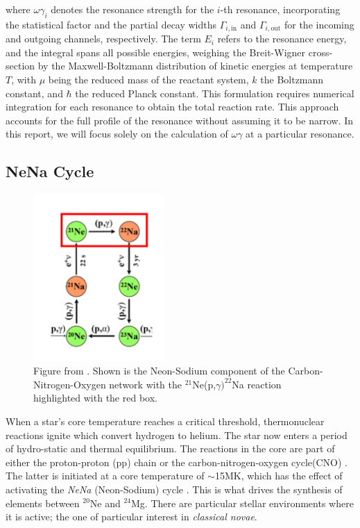\documentclass[a4paper,12pt]{article}
\def\reac{$^{21}$Ne(p,$\gamma)^{22}$Na reaction }
\begin{document}
where \(\omega \gamma_i\) denotes the resonance strength for the \(i\)-th resonance, incorporating the statistical factor and the partial decay widths \(\Gamma_{i,\text{in}}\) and \(\Gamma_{i,\text{out}}\) for the incoming and outgoing channels, respectively. The term \(E_i\) refers to the resonance energy, and the integral spans all possible energies, weighing the Breit-Wigner cross-section by the Maxwell-Boltzmann distribution of kinetic energies at temperature \(T\), with \(\mu\) being the reduced mass of the reactant system, \(k\) the Boltzmann constant, and \(\hbar\) the reduced Planck constant. This formulation requires numerical integration for each resonance to obtain the total reaction rate. This approach accounts for the full profile of the resonance without assuming it to be narrow.  In this report, we will focus solely on the calculation of $\omega\gamma$ at a particular resonance.



\subsection{NeNa Cycle}

\begin{figure}[H]
    \centering
    \includegraphics[width=5cm]{nena.png}
    \caption{Figure from \cite{nena}. Shown is the Neon-Sodium component of the Carbon-Nitrogen-Oxygen network with the \reac highlighted with the red box.}
    \label{fig:Nena}
\end{figure}

    When a star's core temperature reaches a critical threshold, thermonuclear reactions ignite which convert hydrogen to helium.  The star now enters a period of hydro-static and thermal equilibrium.  The reactions in the core are part of either the proton-proton (pp) chain or the carbon-nitrogen-oxygen cycle(CNO) \cite{iliadis2015}.  The latter is initiated at a core temperature of $\sim$15MK, which has the effect of activating the \textit{NeNa} (Neon-Sodium) cycle \cite{fowler1956}.  This is what drives the synthesis of elements between $^{20}$Ne and $^{24}$Mg.  There are particular stellar environments where it is active; the one of particular interest in \textit{classical novae}.  
\end{document}
